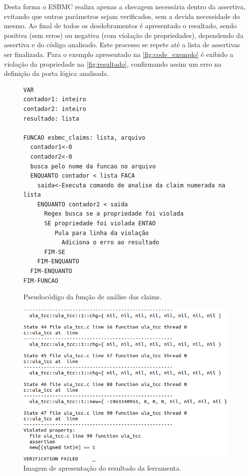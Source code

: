 \par
Desta forma o ESBMC realiza apenas a checagem necessária dentro da assertiva, evitando que outros parâmetros sejam verificados, sem a devida necessidade do mesmo. Ao final de todos os desdobramentos é apresentado o resultado, sendo positiva (sem erros) ou negativa (com violação de propriedades), dependendo da assertiva e do código analisado. Este processo se repete até a lista de assertivas ser finalizada. Para o exemplo apresentado na \autoref{fig:code_exemplo} é exibido a violação da propriedade na \autoref{fig:resultado}, confirmando assim um erro na definição da porta lógica analisada.

\begin{figure}[H]
\caption{\label{fig:analise_claims}Pseudocódigo da função de análise das claims.}
	\begin{center}
    \begin{minipage}{0.7\textwidth}
    \begin{lstlisting}       
VAR
contador1: inteiro
contador2: inteiro
resultado: lista

FUNCAO esbmc_claims: lista, arquivo
  contador1<-0
  contador2<-0
  busca pelo nome da funcao no arquivo
  ENQUANTO contador < lista FACA
    saida<-Executa comando de analise da claim numerada na lista
    ENQUANTO contador2 < saida
      Regex busca se a propriedade foi violada
      SE propriedade foi violada ENTAO
         Pula para linha da violação
	       Adiciona o erro ao resultado       
      FIM-SE  
    FIM-ENQUANTO
  FIM-ENQUANTO
FIM-FUNCAO
    \end{lstlisting}
    \end{minipage}
	\end{center}
\end{figure}

\begin{figure}[H]
	\begin{center}
    \caption{\label{fig:resultado}Imagem de apresentação do resultado da ferramenta.}
	\includegraphics[scale=0.6]{Figuras/erro_assert.png}
	\end{center}
\end{figure}
